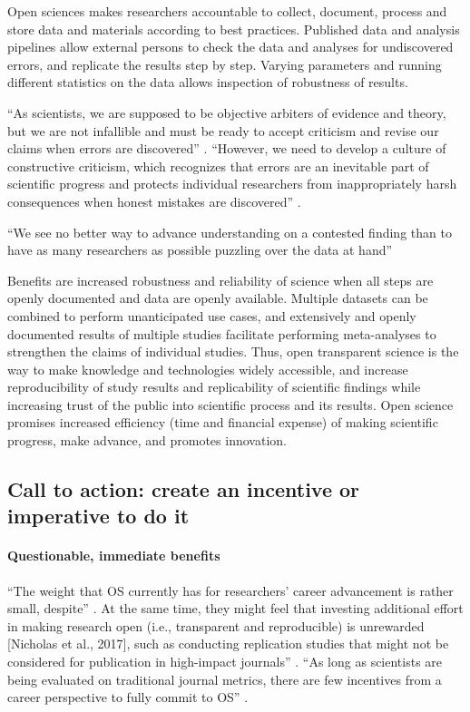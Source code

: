 
%
Open sciences makes researchers accountable to collect, document, process and
store data and materials according to best practices.
%
Published data and analysis pipelines allow external persons to check the data
and analyses for undiscovered errors, and replicate the results step by step.
%
Varying parameters and running different statistics on the data allows
inspection of robustness of results.

%
``As scientists, we are supposed to be objective arbiters of evidence and
theory, but we are not infallible and must be ready to accept criticism and
revise our claims when errors are discovered'' \citep{nichols2017best}.
%
``However, we need to develop a culture of constructive criticism, which
recognizes that errors are an inevitable part of scientific progress and
protects individual researchers from inappropriately harsh consequences when
honest mistakes are discovered'' \citep{nichols2017best}.

%
``We see no better way to advance understanding on a contested finding than to
have as many researchers as possible puzzling over the data at hand''
\citep{nichols2017best}

%
Benefits are increased robustness and reliability of science when all steps are
openly documented and data are openly available.
%
Multiple datasets can be combined to perform unanticipated use cases, and
extensively and openly documented results of multiple studies facilitate
performing meta-analyses to strengthen the claims of individual studies.
%
Thus, open transparent science is the way to make knowledge and technologies
widely accessible, and increase reproducibility of study results and
replicability of scientific findings while increasing trust of the public into
scientific process and its results.
%
Open science promises increased efficiency (time and financial expense) of
making scientific progress, make advance, and promotes innovation.


\subsection{Call to action: create an incentive or imperative to do it}

\paragraph{Questionable, immediate benefits}
%
``The weight that OS currently has for researchers’ career advancement is rather
small, despite'' \citep{toribio2021early}.
%
At the same time, they might feel that investing additional effort in making
research open (i.e., transparent and reproducible) is unrewarded [Nicholas et
al., 2017], such as conducting replication studies that might not be considered
for publication in high-impact journals'' \citep{toribio2021early}.
%
``As long as scientists are being evaluated on traditional journal metrics,
there are few incentives from a career perspective to fully commit to OS''
\citep{toribio2021early}.


